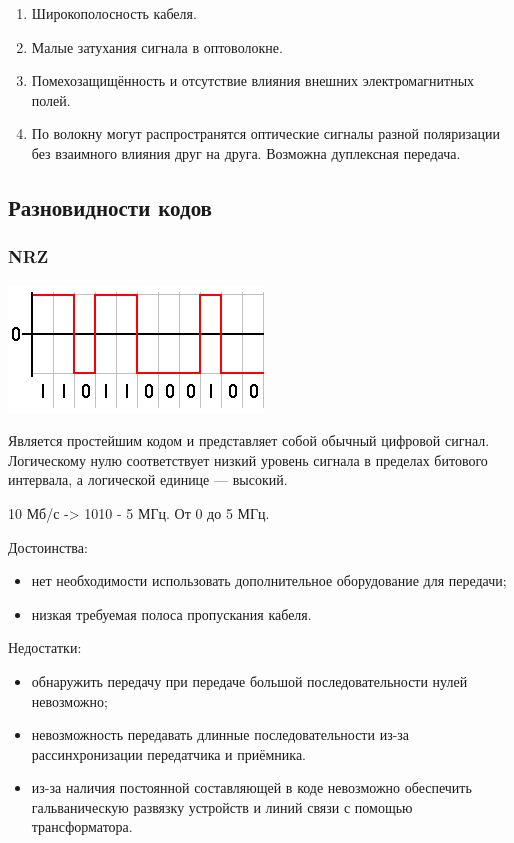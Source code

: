 \documentclass[12pt, russian, oneside, article]{ncc}
\begin{document}
\begin{enumerate}
\item Широкополосность кабеля.
\item Малые затухания сигнала в оптоволокне.
\item Помехозащищённость и отсутствие влияния внешних электромагнитных полей.
\item По волокну могут распространятся оптические сигналы разной поляризации без взаимного влияния друг на друга. Возможна дуплексная передача.
\end{enumerate}
\subsection{Разновидности кодов}
\label{sec-4_7}
\subsubsection{NRZ}
\label{sec-4_7_1}


\includegraphics[]{images/SiSPI/NRZcode.png}

Является простейшим кодом и представляет собой обычный цифровой сигнал. Логическому нулю соответствует низкий уровень сигнала в пределах битового интервала, а логической единице --- высокий.

10 Мб/с -> 1010 - 5 МГц. От 0 до 5 МГц.

Достоинства:
\begin{itemize}
\item нет необходимости использовать дополнительное оборудование для  передачи;
\item низкая требуемая полоса пропускания кабеля.
\end{itemize}

Недостатки:
\begin{itemize}
\item обнаружить передачу при передаче большой последовательности нулей невозможно;
\item невозможность передавать длинные последовательности из-за рассинхронизации передатчика и приёмника.
\item из-за наличия постоянной составляющей в коде невозможно обеспечить гальваническую развязку устройств и линий связи с помощью трансформатора.
\end{itemize}
\end{document}
